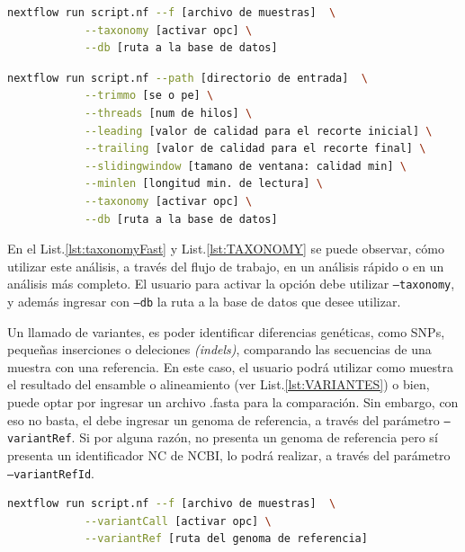 \documentclass[12pt]{article}
\begin{document}
\begin{center}
    \begin{lstlisting}[language=bash, caption=Comando para ejecutar un análisis rápido de identificación taxonómica \emph{(elaboración propia)}., label=lst:taxonomyFast]
        nextflow run script.nf --f [archivo de muestras]  \
            --taxonomy [activar opc] \
            --db [ruta a la base de datos]
    \end{lstlisting}
\end{center}


\begin{center}
    \begin{lstlisting}[language=bash, caption=Comando para la ejecución de un análisis de identificación taxonómica \emph{(elaboración propia)}., label=lst:TAXONOMY]
        nextflow run script.nf --path [directorio de entrada]  \
            --trimmo [se o pe] \
            --threads [num de hilos] \
            --leading [valor de calidad para el recorte inicial] \
            --trailing [valor de calidad para el recorte final] \
            --slidingwindow [tamano de ventana: calidad min] \
            --minlen [longitud min. de lectura] \
            --taxonomy [activar opc] \
            --db [ruta a la base de datos]
    \end{lstlisting}
\end{center}

En el List.\ref{lst:taxonomyFast} y List.\ref{lst:TAXONOMY} se puede 
observar, cómo utilizar este análisis, a través del flujo de 
trabajo, en un análisis rápido o en un análisis más completo. 
El usuario para activar la opción debe utilizar \texttt{--taxonomy}, y 
además ingresar con \texttt{--db} la ruta a la base de datos que desee  
utilizar.

Un llamado de variantes, es poder identificar diferencias genéticas, 
como SNPs, pequeñas inserciones o deleciones \emph{(indels)}, comparando 
las secuencias de una muestra con una referencia. En este caso, el 
usuario podrá utilizar como muestra el resultado del ensamble o 
alineamiento (ver List.\ref{lst:VARIANTES}) o bien, puede optar por  ingresar un 
archivo .fasta para la comparación. Sin embargo, con eso no basta, 
el debe ingresar un genoma de referencia, a través del parámetro 
\texttt{--variantRef}. Si por alguna razón, no presenta un genoma de 
referencia pero sí presenta un identificador NC de NCBI, lo 
podrá realizar, a través del parámetro \texttt{--variantRefId}.

\begin{center}
    \begin{lstlisting}[language=bash, caption=Comando para ejecutar un análisis rápido de llamado de variantes \emph{(elaboración propia)}., label=lst:variantesFast]
        nextflow run script.nf --f [archivo de muestras]  \
            --variantCall [activar opc] \
            --variantRef [ruta del genoma de referencia]
    \end{lstlisting}
\end{center}
\end{document}
